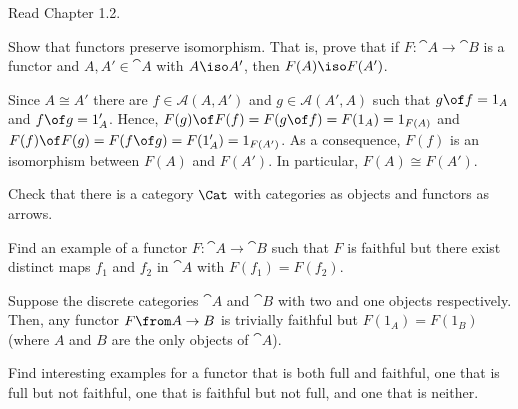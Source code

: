 \def\pathToRoot{../../}

\newcommand{\A}{\cat A}
\newcommand{\B}{\cat B}
\newcommand{\M}{\cat M}
\newcommand{\Rel}{\fcat{Rel}}

\newcommand{\const}[1]{\mathsf{const}_{#1}}




\author{Mostafa Ahmed Abdelfattah Abouhamra, Felix Rech, Dominik Wagner}

\begin{hint}
  Read Chapter 1.2.
\end{hint}

\begin{exercise}
Show that functors preserve isomorphism. That is, prove that if $F : \cat{A} \to \cat{B}$ is a functor and $A, A' \in \cat{A}$ with $A \iso A'$, then $F(A) \iso F(A')$.
\end{exercise}

\begin{answer}
  Since $A\cong A'$ there are $f\in\mathscr A(A,A')$ and $g\in\mathscr A(A',A)$ such that $g \of f=1_A$ and $f \of g=1_A'$. Hence, $F(g)\of F(f)=F(g\of f)=F(1_A)=1_{F(A)}$ and $F(f)\of F(g)=F(f\of g)=F(1_A')=1_{F(A')}$. As a consequence, $F(f)$ is an isomorphism between $F(A)$ and $F(A')$. In particular, $F(A)\cong F(A')$.
\end{answer}

\begin{exercise}
  Check that there is a category $\Cat$ with categories as objects and functors as arrows.
\end{exercise}

\begin{exercise}
  Find an example of a functor $F : \cat{A} \to \cat{B}$ such that $F$ is faithful but there exist distinct maps $f_1$ and $f_2$ in $\cat{A}$ with $F(f_1) = F(f_2)$.
\end{exercise}

\begin{answer}
  Suppose the discrete categories $\A$ and $\B$ with two and one objects respectively. Then, any functor $F\from A\to B$ is trivially faithful but $F(1_A)=F(1_B)$ (where $A$ and $B$ are the only objects of $\A$).
\end{answer}

\begin{exercise}
  Find interesting examples for a functor that is both full and faithful, one that is full but not faithful, one that is faithful but not full, and one that is neither.
\end{exercise}

